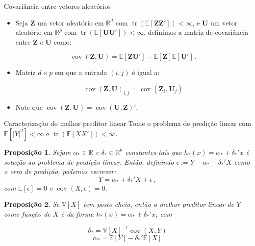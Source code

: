 \documentclass[11pt]{beamer}
\newtheorem{proposition}{Proposição}
\begin{document}
\begin{frame}{Covariância entre vetores aleatórios}
\begin{itemize}
	 		\item Seja $\boldsymbol{Z}$ um vetor aleatório em $\mathbb{R}^d$ com $\operatorname{tr}(\mathbb{E}[\boldsymbol{Z}\boldsymbol{Z}'])<\infty$, e $\boldsymbol{U}$ um vetor aleatório em $\mathbb{R}^p$ com $\operatorname{tr}(\mathbb{E}[\boldsymbol{U}\boldsymbol{U}'])<\infty$, definimos a matriz de covariância entre $\mathbf{Z}$ e $\boldsymbol{U}$  como:
	
	$$\operatorname{cov}(\boldsymbol{Z},\boldsymbol{U}) = \mathbb{E}[\boldsymbol{Z}\boldsymbol{U}'] - \mathbb{E}[\boldsymbol{Z}]\mathbb{E}[\boldsymbol{U}'] \, .$$
	\item Matriz $d \times p$ em que a entrada $(i,j)$ é igual a:
	
	$$\operatorname{cov}(\boldsymbol{Z},\boldsymbol{U})_{i,j} = \operatorname{cov}(\boldsymbol{Z}_i,\boldsymbol{U}_j)$$
	\item Note que $\operatorname{cov}(\boldsymbol{Z},\boldsymbol{U}) = \operatorname{cov}(\boldsymbol{U},\boldsymbol{Z})'$.
\end{itemize}
\end{frame}
\begin{frame}{Caracterização do melhor preditor linear}
	Tome o problema de predição linear com $\mathbb{E}[|Y|^2]<\infty$ e $\operatorname{tr}(\mathbb{E}[XX'])<\infty$. 
	\begin{proposition}
		Sejam $\alpha_* \in \mathbb{R}$ e $\delta_* \in \mathbb{R}^k$ constantes tais que $h_*(x) = \alpha_* + \delta_*'x$ é solução ao problema de predição linear. Então, definindo $\epsilon := Y - \alpha_* - \delta_*'X$ como o erro de predição, podemos escrever:
		$$Y = \alpha_* + \delta_*' X + \epsilon\, ,$$
		com $\mathbb{E}[\epsilon] = 0$ e $\operatorname{cov}(X,\epsilon)=0$.
	\end{proposition}
\begin{proposition}
Se $\mathbb{V}[X]$ tem posto cheio, então o melhor preditor linear de $Y$ como função de $X$ é da forma $h_*(x) = \alpha_* + \delta_*' x$, com

$$\delta_* = \mathbb{V}[X]^{-1} \operatorname{cov}(X,Y)$$
$$\alpha_* = \mathbb{E}[Y] - \delta_*'\mathbb{E}[X]$$

\end{proposition}
\end{frame}
\end{document}
